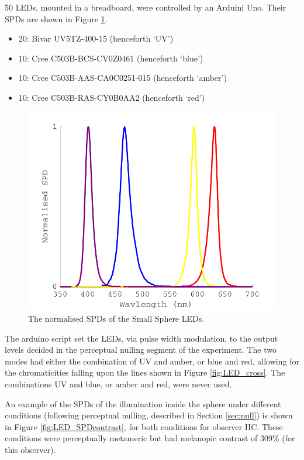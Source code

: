 50 LEDs, mounted in a breadboard, were controlled by an Arduini Uno. Their \glspl{SPD} are shown in Figure \ref{fig:LED_SPDs}. %

\begin{itemize}
    \item 20: Bivar UV5TZ-400-15 (henceforth `UV')
    \item 10: Cree C503B-BCS-CV0Z0461 (henceforth `blue')
    \item 10: Cree C503B-AAS-CA0C0251-015 (henceforth `amber')
    \item 10: Cree C503B-RAS-CY0B0AA2 (henceforth `red')
\end{itemize}


\begin{figure}[htbp]
\includegraphics[max width=\textwidth,center]{figs/SmallSphere/LED_SPDs.pdf}
\caption{The normalised \glspl{SPD} of the Small Sphere \glspl{LED}.}
\label{fig:LED_SPDs}
\end{figure}

The arduino script set the \glspl{LED}, via pulse width modulation, to the output levels decided in the perceptual nulling segment of the experiment. The two modes had either the combination of UV and amber, or blue and red, allowing for the chromaticities falling upon the lines shown in Figure \ref{fig:LED_cross}. The combinations UV and blue, or amber and red, were never used.

An example of the \glspl{SPD} of the illumination inside the sphere under different conditions (following perceptual nulling, described in Section \ref{sec:null}) is shown in Figure \ref{fig:LED_SPDcontrast}, for both conditions for observer HC. These conditions were perceptually metameric but had melanopic contrast of 309\% (for this observer).


